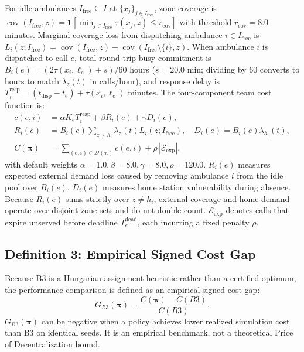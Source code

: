 \documentclass{article}
\begin{document}
For idle ambulances $I_{\mathrm{free}} \subseteq I$ at $\{x_j\}_{j\in I_{\mathrm{free}}}$, zone coverage is $\operatorname{cov}(I_{\mathrm{free}}, z) = \mathbf{1}\left[\min_{j \in I_{\mathrm{free}}} \tau(x_j, z) \le r_{\mathrm{cov}}\right]$ with threshold $r_{\mathrm{cov}} = 8.0$ minutes. Marginal coverage loss from dispatching ambulance $i \in I_{\mathrm{free}}$ is $L_i(z; I_{\mathrm{free}}) = \operatorname{cov}(I_{\mathrm{free}}, z) - \operatorname{cov}(I_{\mathrm{free}} \setminus \{i\}, z)$. When ambulance $i$ is dispatched to call $e$, total round-trip busy commitment is $B_i(e) = (2\tau(x_i, \ell_e) + s)/60$ hours ($s = 20.0$ min; dividing by 60 converts to hours to match $\lambda_z(t)$ in calls/hour), and response delay is $T_i^{\mathrm{resp}} = (t_{\mathrm{disp}} - t_e) + \tau(x_i, \ell_e)$ minutes. The four-component team cost function is:
\begin{align}
c(e, i) &= \alpha K_e T_i^{\mathrm{resp}} + \beta R_i(e) + \gamma D_i(e), \label{eq:dispatch-cost}\\
R_i(e) &= B_i(e) \sum_{z \ne h_i} \lambda_z(t) L_i(z; I_{\mathrm{free}}), \quad D_i(e) = B_i(e) \lambda_{h_i}(t), \label{eq:terms}\\
C(\boldsymbol{\pi}) &= \sum_{(e, i) \in \mathcal{D}(\boldsymbol{\pi})} c(e, i) + \rho\,|\mathcal{E}_{\mathrm{exp}}|, \label{eq:total-cost}
\end{align}
with default weights $\alpha=1.0, \beta=8.0, \gamma=8.0, \rho=120.0$. $R_i(e)$ measures expected external demand loss caused by removing ambulance $i$ from the idle pool over $B_i(e)$. $D_i(e)$ measures home station vulnerability during absence. Because $R_i(e)$ sums strictly over $z \ne h_i$, external coverage and home demand operate over disjoint zone sets and do not double-count. $\mathcal{E}_{\mathrm{exp}}$ denotes calls that expire unserved before deadline $T_e^{\mathrm{dead}}$, each incurring a fixed penalty $\rho$.

\subsection{Definition 3: Empirical Signed Cost Gap}
Because B3 is a Hungarian assignment heuristic rather than a certified optimum, the performance comparison is defined as an empirical signed cost gap:
\begin{equation}
G_{B3}(\boldsymbol{\pi}) = \frac{C(\boldsymbol{\pi}) - C(B3)}{C(B3)}.
\end{equation}
$G_{B3}(\boldsymbol{\pi})$ can be negative when a policy achieves lower realized simulation cost than B3 on identical seeds. It is an empirical benchmark, not a theoretical Price of Decentralization bound.
\end{document}
